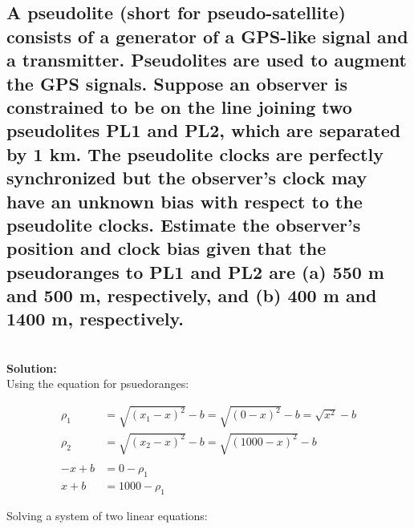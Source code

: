 \documentclass[12pt]{article}
\newcommand{\solution}{\textbf{\\Solution: \\}}
\begin{document}
  \subsection
  {
    A pseudolite (short for pseudo-satellite) consists of a generator of a GPS-like 
    signal and a transmitter. Pseudolites are used to augment the GPS signals. 
    Suppose an observer is constrained to be on the line joining two pseudolites 
    PL1 and PL2, which are separated by 1 km. The pseudolite clocks are perfectly 
    synchronized but the observer's clock may have an unknown bias with respect to 
    the pseudolite clocks. Estimate the observer's position and clock bias given 
    that the pseudoranges to PL1 and PL2 are (a) 550 m and 500 m, respectively, and 
    (b) 400 m and 1400 m, respectively.
  }
  \begin{adjustwidth}{10mm}{0mm}
    \solution
    Using the equation for psuedoranges:

    \begin{equation}
      \begin{split}
        \rho_1 &= \sqrt{(x_1 - x)^2} - b = \sqrt{(0-x)^2} - b = \sqrt{x^2} - b \\
        \rho_2 &= \sqrt{(x_2 - x)^2} - b = \sqrt{(1000 - x)^2} - b \\ \\
        -x + b &= 0 - \rho_1 \\
        x + b  &= 1000 - \rho_1
      \end{split}
    \end{equation}

    Solving a system of two linear equations:


\end{adjustwidth}
\end{document}
